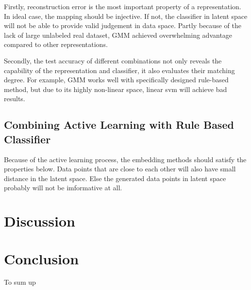 \documentclass[10pt,twocolumn,letterpaper]{article}
\begin{document}
Firstly, reconstruction error is the most important property of a representation. In ideal case, the mapping should be injective. If not, the classifier in latent space will not be able to provide valid judgement in data space. Partly because of the lack of large unlabeled real dataset, GMM achieved overwhelming advantage compared to other representations.

Secondly, the test accuracy of different combinations not only reveals the capability of the representation and classifier, it also evaluates their matching degree. For example, GMM works well with specifically designed rule-based method, but due to its highly non-linear space, linear svm will achieve bad results.

\subsection{Combining Active Learning with Rule Based Classifier}
Because of the active learning process, the embedding methods should satisfy the properties below. Data points that are close to each other will also have small distance in the latent space. Else the generated data points in latent space probably will not be imformative at all.

\section{Discussion}

\section{Conclusion}
To sum up


{\small


}
\end{document}
